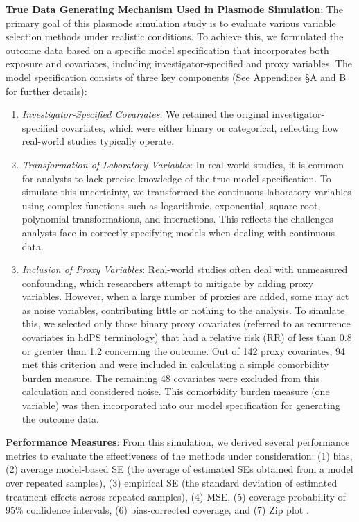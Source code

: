 \documentclass[sn-vancouver,Numbered,lineno,pdflatex]{sn-jnl}
\begin{document}
\textbf{True Data Generating Mechanism Used in Plasmode Simulation}: The
primary goal of this plasmode simulation study is to evaluate various
variable selection methods under realistic conditions. To achieve this,
we formulated the outcome data based on a specific model specification
that incorporates both exposure and covariates, including
investigator-specified and proxy variables. The model specification
consists of three key components (See Appendices \S A and B for further
details):

\begin{enumerate}
\def\labelenumi{\arabic{enumi}.}
\item
  \emph{Investigator-Specified Covariates}: We retained the original
  investigator-specified covariates, which were either binary or
  categorical, reflecting how real-world studies typically operate.
\item
  \emph{Transformation of Laboratory Variables}: In real-world studies,
  it is common for analysts to lack precise knowledge of the true model
  specification. To simulate this uncertainty, we transformed the
  continuous laboratory variables using complex functions such as
  logarithmic, exponential, square root, polynomial transformations, and
  interactions. This reflects the challenges analysts face in correctly
  specifying models when dealing with continuous data.
\item
  \emph{Inclusion of Proxy Variables}: Real-world studies often deal
  with unmeasured confounding, which researchers attempt to mitigate by
  adding proxy variables. However, when a large number of proxies are
  added, some may act as noise variables, contributing little or nothing
  to the analysis. To simulate this, we selected only those binary proxy
  covariates (referred to as recurrence covariates in hdPS terminology)
  that had a relative risk (RR) of less than 0.8 or greater than 1.2
  concerning the outcome. Out of 142 proxy covariates, 94 met this
  criterion and were included in calculating a simple comorbidity burden
  measure. The remaining 48 covariates were excluded from this
  calculation and considered noise. This comorbidity burden measure (one
  variable) was then incorporated into our model specification for
  generating the outcome data.
\end{enumerate}

\textbf{Performance Measures}: From this simulation, we derived several
performance metrics to evaluate the effectiveness of the methods under
consideration: (1) bias, (2) average model-based SE (the average of
estimated SEs obtained from a model over repeated samples), (3)
empirical SE (the standard deviation of estimated treatment effects
across repeated samples), (4) MSE, (5) coverage probability of 95\%
confidence intervals, (6) bias-corrected coverage, and (7) Zip plot
\citep{morris2019using, white2023check}.
\end{document}
